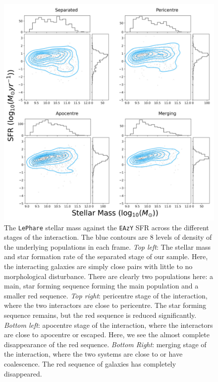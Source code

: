 \begin{figure}
\centering
\includegraphics[width = \textwidth]{Chapter3/figures/sfr-mass-stages.pdf}
\caption[The \texttt{LePhare} stellar mass against the \texttt{EAzY} SFR across the different stages of the interaction.]{The \texttt{LePhare} stellar mass against the \texttt{EAzY} SFR across the different stages of the interaction. The blue contours are 8 levels of density of the underlying populations in each frame. \textit{Top left}: The stellar mass and star formation rate of the separated stage of our sample. Here, the interacting galaxies are simply close pairs with little to no morphological disturbance. There are clearly two populations here: a main, star forming sequence forming the main population and a smaller red sequence. \textit{Top right}: pericentre stage of the interaction, where the two interactors are close to pericentre. The star forming sequence remains, but the red sequence is reduced significantly. \textit{Bottom left}: apocentre stage of the interaction, where the interactors are close to apocentre or escaped. Here, we see the almost complete disappearance of the red sequence. \textit{Bottom Right}: merging stage of the interaction, where the two systems are close to or have coalescence. The red sequence of galaxies has completely disappeared.}
\label{fig:sfr-mass}
\end{figure}

